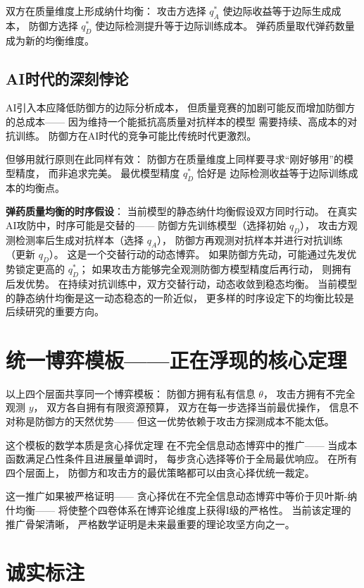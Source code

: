 \documentclass[11pt,a4paper]{article}
\begin{document}
双方在质量维度上形成纳什均衡：
攻击方选择 \(q_A^*\) 使边际收益等于边际生成成本，
防御方选择 \(q_D^*\) 使边际检测提升等于边际训练成本。
弹药质量取代弹药数量成为新的均衡维度。

\subsection{AI时代的深刻悖论}

AI引入本应降低防御方的边际分析成本，
但质量竞赛的加剧可能反而增加防御方的总成本——
因为维持一个能抵抗高质量对抗样本的模型
需要持续、高成本的对抗训练。
防御方在AI时代的竞争可能比传统时代更激烈。

但够用就行原则在此同样有效：
防御方在质量维度上同样要寻求“刚好够用”的模型精度，
而非追求完美。
最优模型精度 \(q_D^*\) 恰好是
边际检测收益等于边际训练成本的均衡点。

\textbf{弹药质量均衡的时序假设}：
当前模型的静态纳什均衡假设双方同时行动。
在真实AI攻防中，时序可能是交替的——
防御方先训练模型（选择初始 \(q_D\)），
攻击方观测检测率后生成对抗样本（选择 \(q_A\)），
防御方再观测对抗样本并进行对抗训练（更新 \(q_D\)）。
这是一个交替行动的动态博弈。
如果防御方先动，可能通过先发优势锁定更高的 \(q_D^*\)；
如果攻击方能够完全观测防御方模型精度后再行动，
则拥有后发优势。
在持续对抗训练中，双方交替行动，动态收敛到稳态均衡。
当前模型的静态纳什均衡是这一动态稳态的一阶近似，
更多样的时序设定下的均衡比较是后续研究的重要方向。

\section{统一博弈模板——正在浮现的核心定理}

以上四个层面共享同一个博弈模板：
防御方拥有私有信息 \(\theta\)，
攻击方拥有不完全观测 \(y\)，
双方各自拥有有限资源预算，
双方在每一步选择当前最优操作，
信息不对称是防御方的天然优势——
但这一优势依赖于攻击方探测成本不能太低。

这个模板的数学本质是贪心择优定理
在不完全信息动态博弈中的推广——
当成本函数满足凸性条件且进展量单调时，
每步贪心选择等价于全局最优响应。
在所有四个层面上，
防御方和攻击方的最优策略都可以由贪心择优统一裁定。

这一推广如果被严格证明——
贪心择优在不完全信息动态博弈中等价于贝叶斯-纳什均衡——
将使整个四卷体系在博弈论维度上获得I级的严格性。
当前该定理的推广骨架清晰，
严格数学证明是未来最重要的理论攻坚方向之一。

\section{诚实标注}
\end{document}
